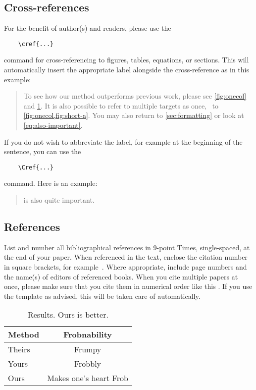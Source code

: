\documentclass[10pt,twocolumn,letterpaper]{article}
\begin{document}
  \subsection{Cross-references}

  For the benefit of author(s) and readers, please use the
  {\small\begin{verbatim}
    \cref{...}
  \end{verbatim}}  command for cross-referencing to figures, tables, equations, or sections.
  This will automatically insert the appropriate label alongside the cross-reference as in this example:
  \begin{quotation}
    To see how our method outperforms previous work, please see \cref{fig:onecol} and \cref{tab:example}.
    It is also possible to refer to multiple targets as once, \eg~to \cref{fig:onecol,fig:short-a}.
    You may also return to \cref{sec:formatting} or look at \cref{eq:also-important}.
  \end{quotation}
  If you do not wish to abbreviate the label, for example at the beginning of the sentence, you can use the
  {\small\begin{verbatim}
    \Cref{...}
  \end{verbatim}}
  command. Here is an example:
  \begin{quotation}
     is also quite important.
  \end{quotation}

  \subsection{References}

  List and number all bibliographical references in 9-point Times, single-spaced, at the end of your paper.
  When referenced in the text, enclose the citation number in square brackets, for
  example~\cite{Authors14}.
  Where appropriate, include page numbers and the name(s) of editors of referenced books.
  When you cite multiple papers at once, please make sure that you cite them in numerical order like this \cite{Alpher02,Alpher03,Alpher05,Authors14b,Authors14}.
  If you use the template as advised, this will be taken care of automatically.

  \begin{table}
    \centering
    \begin{tabular}{@{}lc@{}}
      \toprule
      Method & Frobnability \\
      \midrule
      Theirs & Frumpy \\
      Yours & Frobbly \\
      Ours & Makes one's heart Frob\\
      \bottomrule
    \end{tabular}
    \caption{Results.   Ours is better.}
    \label{tab:example}
  \end{table}
\end{document}
